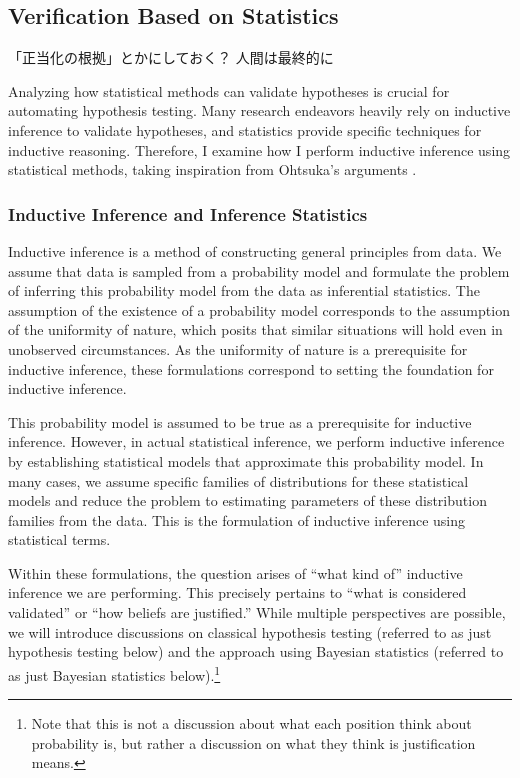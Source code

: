 \documentclass{article}
\begin{document}
\subsection{Verification Based on Statistics}
「正当化の根拠」とかにしておく？
人間は最終的に

Analyzing how statistical methods can validate hypotheses is crucial for automating hypothesis testing. Many research endeavors heavily rely on inductive inference to validate hypotheses, and statistics provide specific techniques for inductive reasoning. Therefore, I examine how I perform inductive inference using statistical methods, taking inspiration from Ohtsuka's arguments \cite{otsuka2022thinking}.

\subsubsection{Inductive Inference and Inference Statistics}

Inductive inference is a method of constructing general principles from data. We assume that data is sampled from a probability model and formulate the problem of inferring this probability model from the data as inferential statistics. The assumption of the existence of a probability model corresponds to the assumption of the uniformity of nature, which posits that similar situations will hold even in unobserved circumstances. As the uniformity of nature is a prerequisite for inductive inference, these formulations correspond to setting the foundation for inductive inference.

This probability model is assumed to be true as a prerequisite for inductive inference. However, in actual statistical inference, we perform inductive inference by establishing statistical models that approximate this probability model. In many cases, we assume specific families of distributions for these statistical models and reduce the problem to estimating parameters of these distribution families from the data. This is the formulation of inductive inference using statistical terms.

Within these formulations, the question arises of ``what kind of'' inductive inference we are performing. This precisely pertains to ``what is considered validated'' or ``how beliefs are justified.'' While multiple perspectives are possible, we will introduce discussions on classical hypothesis testing (referred to as just hypothesis testing below) and the approach using Bayesian statistics (referred to as just Bayesian statistics below).\footnote{
Note that this is not a discussion about what each position think about probability is, but rather a discussion on what they think is justification means.
}
\end{document}
